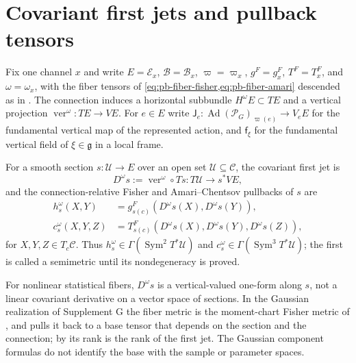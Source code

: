 \section{Covariant first jets and pullback tensors}
\label{sec:pb-covariant-jets}

Fix one channel \(x\) and write \(E=\mathcal E_x\), \(\mathcal B=\mathcal B_x\),
\(\varpi=\varpi_x\), \(g^F=g^F_x\), \(T^F=T^F_x\), and \(\omega=\omega_x\), with the fiber tensors of
\cref{eq:pb-fiber-fisher,eq:pb-fiber-amari} descended as in .
The connection induces a horizontal subbundle \(H^\omega E\subset TE\) and a vertical projection
\(\operatorname{ver}^\omega:TE\to VE\). For \(e\in E\) write
\(\mathsf J_e:\operatorname{Ad}(\mathscr P_G)_{\varpi(e)}\to V_eE\) for the fundamental vertical map
of the represented action, and \(\mathsf f_\xi\) for the fundamental vertical field of
\(\xi\in\mathfrak g\) in a local frame.

For a smooth section \(s:\mathcal U\to E\) over an open set \(\mathcal U\subseteq\mathcal C\), the
covariant first jet is
\begin{equation}
D^\omega s
:=\operatorname{ver}^{\omega}\circ Ts
:T\mathcal U\longrightarrow s^*VE,
\label{eq:pb-covariant-first-jet}
\end{equation}
and the connection-relative Fisher and Amari--Chentsov pullbacks of \(s\) are
\begin{align}
h_s^\omega(X,Y)
&=g^F_{s(c)}(D^\omega s(X),D^\omega s(Y)),
\label{eq:pb-fisher-pullback}\\
c_s^\omega(X,Y,Z)
&=T^F_{s(c)}(D^\omega s(X),D^\omega s(Y),D^\omega s(Z)),
\label{eq:pb-amari-pullback}
\end{align}
for \(X,Y,Z\in T_c\mathcal C\). Thus \(h_s^\omega\in\Gamma(\operatorname{Sym}^2T^*\mathcal U)\) and
\(c_s^\omega\in\Gamma(\operatorname{Sym}^3T^*\mathcal U)\); the first is called a semimetric until
its nondegeneracy is proved.

For nonlinear statistical fibers, \(D^\omega s\) is a vertical-valued one-form along \(s\), not a
linear covariant derivative on a vector space of sections. In the Gaussian realization of
Supplement G the fiber metric is the moment-chart Fisher metric of ,
and  pulls it back to a base tensor that depends on the section
and the connection; by  its rank is the rank of the first jet.
The Gaussian component formulas do not identify the base with the sample or parameter spaces.

